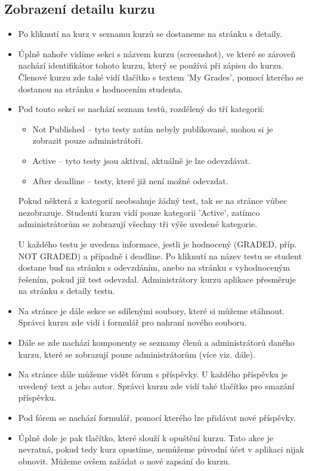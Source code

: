 \subsection{Zobrazení detailu kurzu}

\begin{itemize}
	\item Po kliknutí na kurz v seznamu kurzů se dostaneme na stránku s detaily.
	\item Úplně nahoře vidíme sekci s názvem kurzu (screenshot), ve které se zároveň nachází identifikátor tohoto kurzu, který se používá při zápisu do kurzu. Členové kurzu zde také vidí tlačítko s textem 'My Grades', pomocí kterého se dostanou na stránku s hodnocením studenta.
	\item Pod touto sekcí se nachází seznam testů, rozdělený do tří kategorií:
		\begin{itemize}
			\item Not Published -- tyto testy zatím nebyly publikované, mohou si je zobrazit pouze administrátoři.
			\item Active -- tyto testy jsou aktivní, aktuálně je lze odevzdávat.
			\item After deadline -- testy, které již není možné odevzdat.
		\end{itemize}
		Pokud některá z kategorií neobsahuje žádný test, tak se na stránce vůbec nezobrazuje. Studenti kurzu vidí pouze kategorii 'Active', zatímco administrátorům se zobrazují všechny tři výše uvedené kategorie.
		
		U každého testu je uvedena informace, jestli je hodnocený (GRADED, příp. NOT GRADED) a případně i deadline.
		Po kliknutí na název testu se student dostane buď na stránku s odevzdáním, anebo na stránku s vyhodnoceným řešením, pokud již test odevzdal. Administrátory kurzu aplikace přesměruje na stránku s detaily testu.
		
	\item Na stránce je dále sekce se sdílenými soubory, které si můžeme stáhnout. Správci kurzu zde vidí i formulář pro nahraní nového souboru.
	\item Dále se zde nachází komponenty se seznamy členů a administrátorů daného kurzu, které se zobrazují pouze administrátorům (více viz. dále).
	\item Na stránce dále můžeme vidět fórum s příspěvky. U každého příspěvku je uvedený text a jeho autor. Správci kurzu zde vidí také tlačítko pro smazání příspěvku.
	\item Pod fórem se nachází formulář, pomocí kterého lze přidávat nové příspěvky.
	\item Úplně dole je pak tlačítko, které slouží k opuštění kurzu. Tato akce je nevratná, pokud tedy kurz opustíme, nemůžeme původní účet v aplikaci nijak obnovit. Můžeme ovšem zažádat o nové zapsání do kurzu.
\end{itemize}


